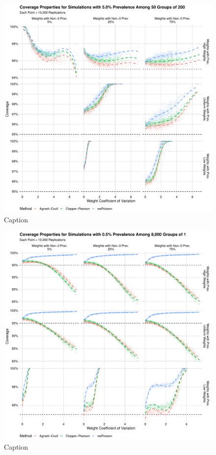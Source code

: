 \documentclass[AMA,STIX1COL]{WileyNJD-v2}
\begin{document}
\begin{figure}
\centering
\includegraphics[width=\textwidth]{figures/perfect_coverage_50_groups_0_05_prev.pdf}
\caption{Caption}
\label{fig:perfect_coverage_50_groups_0_05_prev}
\end{figure}

\begin{figure}
\centering
\includegraphics[width=\textwidth]{figures/perfect_coverage_8000_groups_0_005_prev.pdf}
\caption{Caption}
\label{fig:perfect_coverage_8000_groups_0_005_prev}
\end{figure}
\end{document}
